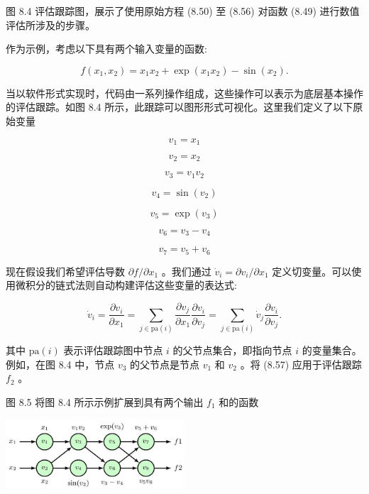 \documentclass[10pt]{article}
\begin{document}
图 8.4 评估跟踪图，展示了使用原始方程 (8.50) 至 (8.56) 对函数 (8.49) 进行数值评估所涉及的步骤。

作为示例，考虑以下具有两个输入变量的函数:

\[
f\left( {{x}_{1},{x}_{2}}\right)  = {x}_{1}{x}_{2} + \exp \left( {{x}_{1}{x}_{2}}\right)  - \sin \left( {x}_{2}\right) . \tag{8.49}
\]

当以软件形式实现时，代码由一系列操作组成，这些操作可以表示为底层基本操作的评估跟踪。如图 8.4 所示，此跟踪可以图形形式可视化。这里我们定义了以下原始变量

\[
{v}_{1} = {x}_{1} \tag{8.50}
\]

\[
{v}_{2} = {x}_{2} \tag{8.51}
\]

\[
{v}_{3} = {v}_{1}{v}_{2} \tag{8.52}
\]

\[
{v}_{4} = \sin \left( {v}_{2}\right)  \tag{8.53}
\]

\[
{v}_{5} = \exp \left( {v}_{3}\right)  \tag{8.54}
\]

\[
{v}_{6} = {v}_{3} - {v}_{4} \tag{8.55}
\]

\[
{v}_{7} = {v}_{5} + {v}_{6} \tag{8.56}
\]

现在假设我们希望评估导数 \(\partial f/\partial {x}_{1}\) 。我们通过 \({\dot{v}}_{i} = \partial {v}_{i}/\partial {x}_{1}\) 定义切变量。可以使用微积分的链式法则自动构建评估这些变量的表达式:

\[
{\dot{v}}_{i} = \frac{\partial {v}_{i}}{\partial {x}_{1}} = \mathop{\sum }\limits_{{j \in  \mathrm{{pa}}\left( i\right) }}\frac{\partial {v}_{j}}{\partial {x}_{1}}\frac{\partial {v}_{i}}{\partial {v}_{j}} = \mathop{\sum }\limits_{{j \in  \mathrm{{pa}}\left( i\right) }}{\dot{v}}_{j}\frac{\partial {v}_{i}}{\partial {v}_{j}}. \tag{8.57}
\]

其中 \(\mathrm{{pa}}\left( i\right)\) 表示评估跟踪图中节点 \(i\) 的父节点集合，即指向节点 \(i\) 的变量集合。例如，在图 8.4 中，节点 \({v}_{3}\) 的父节点是节点 \({v}_{1}\) 和 \({v}_{2}\) 。将 (8.57) 应用于评估跟踪 \({f}_{2}\) 。

图 8.5 将图 8.4 所示示例扩展到具有两个输出 \({f}_{1}\) 和的函数

\begin{center}
\includegraphics[max width=0.5\textwidth]{images/0194e279-9b28-703a-88f4-c3ac21e2010d_267_857_354_688_267_0.jpg}
\end{center}
\hspace*{3em} 
\end{document}
